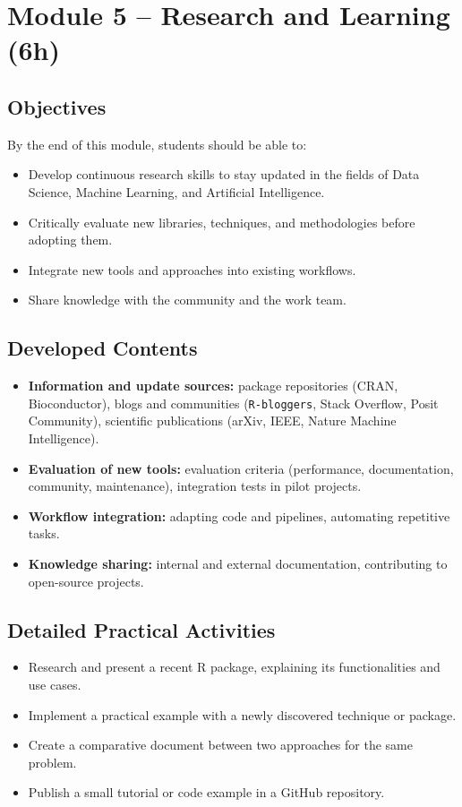 \section{\textcolor{sectionred}{Module 5 – Research and Learning (6h)}}

\subsection{\textcolor{subsectionblue}{Objectives}}
By the end of this module, students should be able to:
\begin{itemize}
  \item Develop continuous research skills to stay updated in the fields of Data Science, Machine Learning, and Artificial Intelligence.  
  \item Critically evaluate new libraries, techniques, and methodologies before adopting them.  
  \item Integrate new tools and approaches into existing workflows.  
  \item Share knowledge with the community and the work team.
\end{itemize}

\subsection{\textcolor{subsectionblue}{Developed Contents}}
\begin{itemize}
  \item \textbf{Information and update sources:} package repositories (CRAN, Bioconductor), blogs and communities (\texttt{R-bloggers}, Stack Overflow, Posit Community), scientific publications (arXiv, IEEE, Nature Machine Intelligence).
  \item \textbf{Evaluation of new tools:} evaluation criteria (performance, documentation, community, maintenance), integration tests in pilot projects.
  \item \textbf{Workflow integration:} adapting code and pipelines, automating repetitive tasks.
  \item \textbf{Knowledge sharing:} internal and external documentation, contributing to open-source projects.
\end{itemize}

\subsection{\textcolor{subsectionblue}{Detailed Practical Activities}}
\begin{itemize}
  \item Research and present a recent R package, explaining its functionalities and use cases.
  \item Implement a practical example with a newly discovered technique or package.
  \item Create a comparative document between two approaches for the same problem.
  \item Publish a small tutorial or code example in a GitHub repository.
\end{itemize}

